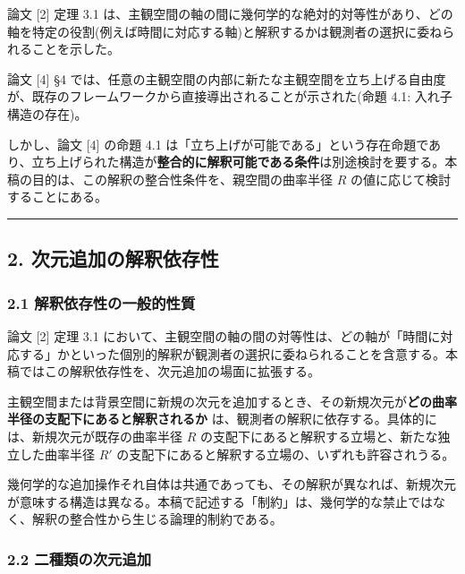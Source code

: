 \documentclass[a4paper,11pt]{ltjsarticle}
\theoremstyle{definition}
\begin{document}
論文 {[}2{]} 定理 3.1 は、主観空間の軸の間に幾何学的な絶対的対等性があり、どの軸を特定の役割(例えば時間に対応する軸)と解釈するかは観測者の選択に委ねられることを示した。

論文 {[}4{]} §4 では、任意の主観空間の内部に新たな主観空間を立ち上げる自由度が、既存のフレームワークから直接導出されることが示された(命題 4.1: 入れ子構造の存在)。

しかし、論文 {[}4{]} の命題 4.1 は「立ち上げが可能である」という存在命題であり、立ち上げられた構造が\textbf{整合的に解釈可能である条件}は別途検討を要する。本稿の目的は、この解釈の整合性条件を、親空間の曲率半径 \(R\) の値に応じて検討することにある。

\begin{center}\rule{0.5\linewidth}{0.5pt}\end{center}

\subsection{2. 次元追加の解釈依存性}\label{ux6b21ux5143ux8ffdux52a0ux306eux89e3ux91c8ux4f9dux5b58ux6027}

\subsubsection{2.1 解釈依存性の一般的性質}\label{ux89e3ux91c8ux4f9dux5b58ux6027ux306eux4e00ux822cux7684ux6027ux8cea}

論文 {[}2{]} 定理 3.1 において、主観空間の軸の間の対等性は、どの軸が「時間に対応する」かといった個別的解釈が観測者の選択に委ねられることを含意する。本稿ではこの解釈依存性を、次元追加の場面に拡張する。

主観空間または背景空間に新規の次元を追加するとき、その新規次元が\textbf{どの曲率半径の支配下にあると解釈されるか} は、観測者の解釈に依存する。具体的には、新規次元が既存の曲率半径 \(R\) の支配下にあると解釈する立場と、新たな独立した曲率半径 \(R'\) の支配下にあると解釈する立場の、いずれも許容されうる。

幾何学的な追加操作それ自体は共通であっても、その解釈が異なれば、新規次元が意味する構造は異なる。本稿で記述する「制約」は、幾何学的な禁止ではなく、解釈の整合性から生じる論理的制約である。

\subsubsection{2.2 二種類の次元追加}\label{ux4e8cux7a2eux985eux306eux6b21ux5143ux8ffdux52a0}
\end{document}
